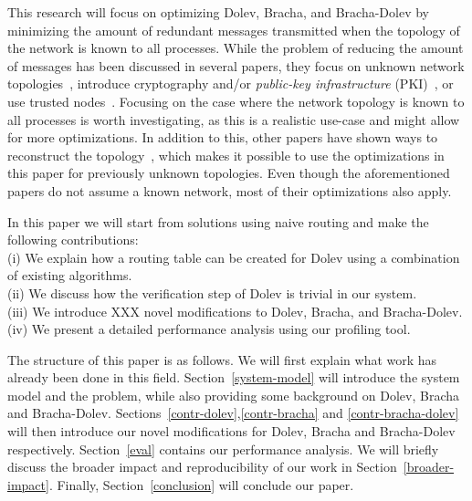 This research will focus on optimizing Dolev, Bracha, and Bracha-Dolev by minimizing the amount of redundant messages transmitted when the topology of the network is known to all processes. While the problem of reducing the amount of messages has been discussed in several papers, they focus on unknown network topologies~\cite{dolev-improvement,bonomi2019multihop,bonomi2021practical}, introduce cryptography and/or \textit{public-key infrastructure} (PKI)~\cite{signatures-crypo-1,pki-crypto-2}, or use trusted nodes~\cite{using-tee}. Focusing on the case where the network topology is known to all processes is worth investigating, as this is a realistic use-case and might allow for more optimizations. In addition to this, other papers have shown ways to reconstruct the topology~\cite{topology-discovery}, which makes it possible to use the optimizations in this paper for previously unknown topologies.
Even though the aforementioned papers do not assume a known network, most of their optimizations also apply.

In this paper we will start from solutions using naive routing and make the following contributions:\\
(i) We explain how a routing table can be created for Dolev using a combination of existing algorithms.\\
(ii) We discuss how the verification step of Dolev is trivial in our system.\\
(iii) We introduce XXX novel modifications to Dolev, Bracha, and Bracha-Dolev.\\
(iv) We present a detailed performance analysis using our profiling tool.

The structure of this paper is as follows. We will first explain what work has already been done in this field. Section~\ref{system-model} will introduce the system model and the problem, while also providing some background on Dolev, Bracha and Bracha-Dolev. Sections~\ref{contr-dolev},\ref{contr-bracha} and \ref{contr-bracha-dolev} will then introduce our novel modifications for Dolev, Bracha and Bracha-Dolev respectively. Section~\ref{eval} contains our performance analysis. We will briefly discuss the broader impact and reproducibility of our work in Section~\ref{broader-impact}. Finally, Section~\ref{conclusion} will conclude our paper.

